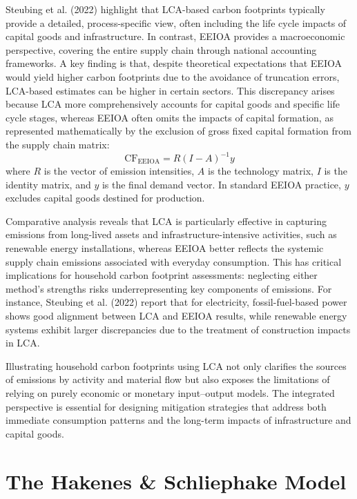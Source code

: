 \documentclass[12pt,a4paper]{article}%
\begin{document}
Steubing et al. (2022) highlight that LCA-based carbon footprints typically provide a detailed, process-specific view, often including the life cycle impacts of capital goods and infrastructure. In contrast, EEIOA provides a macroeconomic perspective, covering the entire supply chain through national accounting frameworks. A key finding is that, despite theoretical expectations that EEIOA would yield higher carbon footprints due to the avoidance of truncation errors, LCA-based estimates can be higher in certain sectors. This discrepancy arises because LCA more comprehensively accounts for capital goods and specific life cycle stages, whereas EEIOA often omits the impacts of capital formation, as represented mathematically by the exclusion of gross fixed capital formation from the supply chain matrix:
\begin{equation}
\text{CF}_{\text{EEIOA}} = R {(I - A)}^{-1} y
\end{equation}
where $R$ is the vector of emission intensities, $A$ is the technology matrix, $I$ is the identity matrix, and $y$ is the final demand vector. In standard EEIOA practice, $y$ excludes capital goods destined for production.

Comparative analysis reveals that LCA is particularly effective in capturing emissions from long-lived assets and infrastructure-intensive activities, such as renewable energy installations, whereas EEIOA better reflects the systemic supply chain emissions associated with everyday consumption. This has critical implications for household carbon footprint assessments: neglecting either method's strengths risks underrepresenting key components of emissions. For instance, Steubing et al. (2022) report that for electricity, fossil-fuel-based power shows good alignment between LCA and EEIOA results, while renewable energy systems exhibit larger discrepancies due to the treatment of construction impacts in LCA.

Illustrating household carbon footprints using LCA not only clarifies the sources of emissions by activity and material flow but also exposes the limitations of relying on purely economic or monetary input--output models. The integrated perspective is essential for designing mitigation strategies that address both immediate consumption patterns and the long-term impacts of infrastructure and capital goods.

\section*{The Hakenes \& Schliephake Model}
\end{document}
